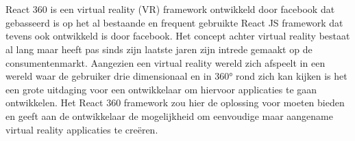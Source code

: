 
%
%

%



\chapter*{}

React 360 is een virtual reality (VR) framework ontwikkeld door facebook dat gebasseerd is op het al bestaande en frequent gebruikte React JS framework dat tevens ook ontwikkeld is door facebook. Het concept achter virtual reality bestaat al lang maar heeft pas sinds zijn laatste jaren zijn intrede gemaakt op de consumentenmarkt. Aangezien een virtual reality wereld zich afspeelt in een wereld waar de gebruiker drie dimensionaal en in 360° rond zich kan kijken is het een grote uitdaging voor een ontwikkelaar om hiervoor applicaties te gaan ontwikkelen. Het React 360 framework zou hier de oplossing voor moeten bieden en geeft aan de ontwikkelaar de mogelijkheid om eenvoudige maar aangename virtual reality applicaties te creëren.

